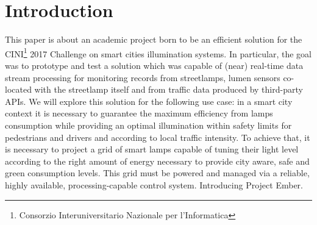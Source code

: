 \section{Introduction}
This paper is about an academic project born to be an efficient solution for the CINI\footnote{Consorzio Interuniversitario Nazionale per l'Informatica} 2017 Challenge on smart cities illumination systems. In particular, the goal was to prototype and test a solution which was capable of (near) real-time data stream processing for monitoring records from streetlamps, lumen sensors co-located with the streetlamp itself and from traffic data produced by third-party APIs. We will explore this solution for the following use case: in a smart city context it is necessary to guarantee the maximum efficiency from lamps consumption while providing an optimal illumination within safety limits for pedestrians and drivers and according to local traffic intensity. To achieve that, it is necessary to project a grid of smart lamps capable of tuning their light level according to the right amount of energy necessary to provide city aware, safe and green consumption levels. This grid must be powered and managed via a reliable, highly available, processing-capable control system. Introducing Project Ember.

